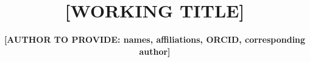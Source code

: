 \documentclass[11pt]{article}
\title{[WORKING TITLE]}
\author{\textbf{[AUTHOR TO PROVIDE: names, affiliations, ORCID, corresponding author]}}
\date{}
\theoremstyle{definition}
\theoremstyle{remark}
\begin{document}
\maketitle

\begin{abstract}

\end{abstract}












\appendix

\end{document}

